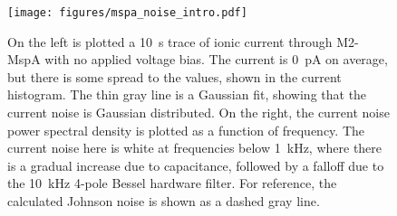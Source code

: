 \begin{figure}[h]
\begin{centering}
\texttt{[image: figures/mspa\_noise\_intro.pdf]}
\caption[Current noise in the MspA nanopore]{On the left is plotted a \SI{10}{\s} trace of ionic current through M2-MspA with no applied voltage bias.  The current is \SI{0}{\pA} on average, but there is some spread to the values, shown in the current histogram.  The thin gray line is a Gaussian fit, showing that the current noise is Gaussian distributed.  On the right, the current noise power spectral density is plotted as a function of frequency.  The current noise here is white at frequencies below \SI{1}{\kHz}, where there is a gradual increase due to capacitance, followed by a falloff due to the \SI{10}{\kHz} 4-pole Bessel hardware filter.  For reference, the calculated Johnson noise is shown as a dashed gray line.}
\label{fig:mspa_noise_intro}
\end{centering}
\end{figure}